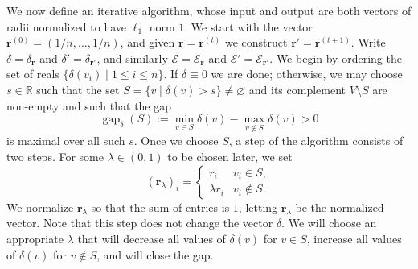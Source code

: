 \documentclass[UTF8,11pt]{ctexart}
\theoremstyle{definition}
\newcommand{\R}{\mathbb R}
\begin{document}
We now define an iterative algorithm, whose input and output are both vectors of radii normalized to have $\ell_1$ norm $1$. We start with the vector $\mathbf r^{(0)}=(1/n,\ldots,1/n)$, and given $\mathbf r=\mathbf r^{(t)}$ we construct $\mathbf r'=\mathbf r^{(t+1)}$. Write $\delta=\delta_{\mathbf r}$ and $\delta'=\delta_{\mathbf r'}$, and similarly $\mathcal E=\mathcal E_{\mathbf r}$ and $\mathcal E'=\mathcal E_{\mathbf r'}$. We begin by ordering the set of reals $\{\delta(v_i)\mid1\le i\le n\}$. If $\delta\equiv0$ we are done; otherwise, we may choose $s\in\R$ such that the set $S=\{v\mid\delta(v)>s\}\ne\varnothing$ and its complement $V\setminus S$ are non-empty and such that the gap
\[
\operatorname{gap}_{\delta}(S):=\min_{v\in S}\delta(v)-\max_{v\notin S}\delta(v)>0
\]
is maximal over all such $s$. Once we choose $S$, a step of the algorithm consists of two steps. For some $\lambda\in(0,1)$ to be chosen later, we set
\[
(\mathbf r_\lambda)_i=\begin{cases}r_i&v_i\in S,\\\lambda r_i&v_i\notin S.\end{cases}
\]
We normalize $\mathbf r_\lambda$ so that the sum of entries is $1$, letting $\bar{\mathbf r}_\lambda$ be the normalized vector. Note that this step does not change the vector $\delta$. We will choose an appropriate $\lambda$ that will decrease all values of $\delta(v)$ for $v\in S$, increase all values of $\delta(v)$ for $v\notin S$, and will close the gap.
\end{document}
